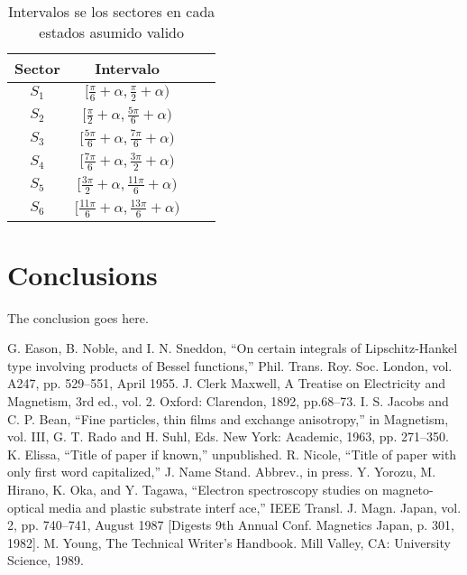 \documentclass[conference]{IEEEtran}
\begin{document}
\begin{table}[h!]
\centering
\small
\begin{tabular}{@{}cccc@{}}
\toprule
Sector & Intervalo  \\ \midrule
$S_{1}$ & $[\tfrac{\pi}{6}+\alpha,\tfrac{\pi}{2}+\alpha)$ \\
$S_{2}$ & $[\tfrac{\pi}{2}+\alpha,\tfrac{5\pi}{6}+\alpha)$ \\
$S_{3}$ & $[\tfrac{5\pi}{6}+\alpha,\tfrac{7\pi}{6}+\alpha)$\\
$S_{4}$ & $[\tfrac{7\pi}{6}+\alpha,\tfrac{3\pi}{2}+\alpha)$\\
$S_{5}$ & $[\tfrac{3\pi}{2}+\alpha,\tfrac{11\pi}{6}+\alpha)$\\
$S_{6}$ & $[\tfrac{11\pi}{6}+\alpha,\tfrac{13\pi}{6}+\alpha)$\\ \bottomrule
\end{tabular}
\caption{Intervalos se los sectores en cada estados asumido valido}
\label{tab:estados}
\end{table}

\section{Conclusions}
The conclusion goes here.

\begin{thebibliography}{plain}
 G. Eason, B. Noble, and I. N. Sneddon, ``On certain integrals of Lipschitz-Hankel type involving products of Bessel functions,'' Phil. Trans. Roy. Soc. London, vol. A247, pp. 529--551, April 1955.
 J. Clerk Maxwell, A Treatise on Electricity and Magnetism, 3rd ed., vol. 2. Oxford: Clarendon, 1892, pp.68--73.
 I. S. Jacobs and C. P. Bean, ``Fine particles, thin films and exchange anisotropy,'' in Magnetism, vol. III, G. T. Rado and H. Suhl, Eds. New York: Academic, 1963, pp. 271--350.
 K. Elissa, ``Title of paper if known,'' unpublished.
 R. Nicole, ``Title of paper with only first word capitalized,'' J. Name Stand. Abbrev., in press.
 Y. Yorozu, M. Hirano, K. Oka, and Y. Tagawa, ``Electron spectroscopy studies on magneto-optical media and plastic substrate interf	ace,'' IEEE Transl. J. Magn. Japan, vol. 2, pp. 740--741, August 1987 [Digests 9th Annual Conf. Magnetics Japan, p. 301, 1982].
 M. Young, The Technical Writer's Handbook. Mill Valley, CA: University Science, 1989.
\end{thebibliography}
\end{document}
